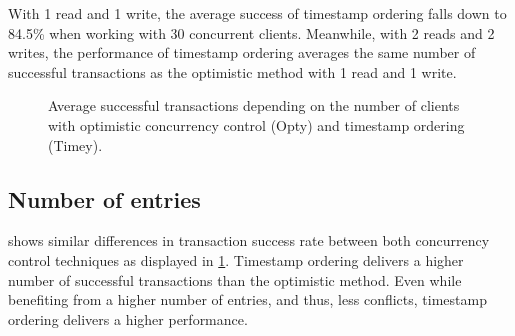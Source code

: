 \documentclass[a4paper, 10pt]{article}
\begin{document}
With 1 read and 1 write, the average success of timestamp ordering falls down to 84.5\% when working with 30 concurrent clients. Meanwhile, with 2 reads and 2 writes, the performance of timestamp ordering averages the same number of successful transactions as the optimistic method with 1 read and 1 write.

\begin{figure}[htp]
\begin{center}
\caption{Average successful transactions depending on the number of clients with optimistic concurrency control (Opty) and timestamp ordering (Timey).}
\label{fig:tnclients}
\end{center}
\end{figure}

\subsection{Number of entries}

 shows similar differences in transaction success rate between both concurrency control techniques as displayed in \cref{fig:tnclients}. Timestamp ordering delivers a higher number of successful transactions than the optimistic method. Even while benefiting from a higher number of entries, and thus, less conflicts, timestamp ordering delivers a higher performance.
\end{document}
